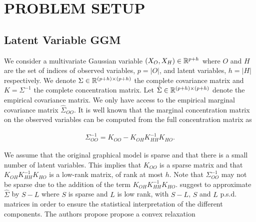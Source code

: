 \section{PROBLEM SETUP}
\label{setup}

\subsection{Latent Variable GGM}
\label{sec:ggm}
We consider a multivariate Gaussian variable $(X_{O},X_{H})\in\mathbb{R}^{p+h}$ where $O$ and $H$ are the set of indices of observed variables, $p=|O|$, and latent variables, $h=|H|$ respectively. We denote $\Sigma\in\mathbb{R}^{(p+h)\times(p+h)}$ the complete covariance matrix and $K=\Sigma^{-1}$ the complete concentration matrix. Let $\hat{\Sigma}\in\mathbb{R}^{(p+h)\times(p+h)}$ denote the empirical covariance matrix. We only have access to the empirical marginal covariance matrix $\hat{\Sigma}_{OO}$. It is well known that the marginal concentration matrix on the observed variables can be computed from the full concentration matrix as

\begin{align}
\Sigma_{OO}^{-1} = K_{OO}-K_{OH}K_{HH}^{-1}K_{HO}.
\end{align}

We assume that the original graphical model is sparse and that there is a small number of latent variables. 
This implies that  $K_{OO}$ is a sparse matrix and that $K_{OH}K_{HH}^{-1}K_{HO}$ is a low-rank matrix, of rank at most $h$. Note that $\Sigma_{OO}^{-1}$ may not be sparse due to the addition of the term $K_{OH}K_{HH}^{-1}K_{HO}$.
\citet{chandrasekaran2010} suggest to approximate $\hat{\Sigma}$  by $S-L$ where $S$ is sparse and $L$ is low rank, with $S-L$, $S$ and $L$ p.s.d. matrices in order to ensure the statistical interpretation of the different components. The authors propose propose a convex relaxation 


